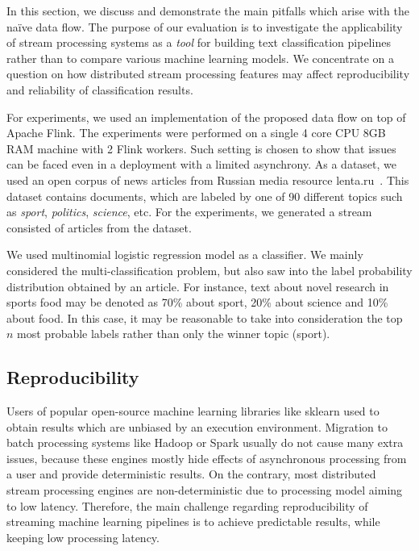 \label {fs-discussion}

In this section, we discuss and demonstrate the main pitfalls which arise with the na\"ive data flow. The purpose of our evaluation is to investigate the applicability of stream processing systems as a {\em tool} for building text classification pipelines rather than to compare various machine learning models. We concentrate on a question on how distributed stream processing features may affect reproducibility and reliability of classification results.

For experiments, we used an implementation of the proposed data flow on top of Apache Flink. The experiments were performed on a single 4 core CPU 8GB RAM machine with 2 Flink workers. Such setting is chosen to show that issues can be faced even in a deployment with a limited asynchrony. As a dataset, we used an open corpus of news articles from Russian media resource lenta.ru~\cite{lentaru}. This dataset contains documents, which are labeled by one of 90 different topics such as {\em sport}, {\em politics}, {\em science}, etc. For the experiments, we generated a stream consisted of articles from the dataset.

We used multinomial logistic regression model as a classifier. We mainly considered the multi-classification problem, but also saw into the label probability distribution obtained by an article. For instance, text about novel research in sports food may be denoted as 70\% about sport, 20\% about science and 10\% about food. In this case, it may be reasonable to take into consideration the top $n$ most probable labels rather than only the winner topic (sport).

\subsection{Reproducibility}

Users of popular open-source machine learning libraries like sklearn used to obtain results which are unbiased by an execution environment. Migration to batch processing systems like Hadoop or Spark usually do not cause many extra issues, because these engines mostly hide effects of asynchronous processing from a user and provide deterministic results. On the contrary, most distributed stream processing engines are non-deterministic due to processing model aiming to low latency. Therefore, the main challenge regarding reproducibility of streaming machine learning pipelines is to achieve predictable results, while keeping low processing latency. 

